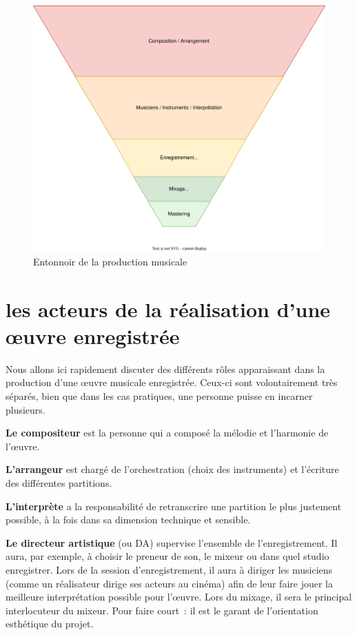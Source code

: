 \documentclass[
]{book}
\begin{document}
\begin{figure}
\includegraphics[width=0.8\linewidth]{_resources/diagrams/productionSonore} \caption{Entonnoir de la production musicale}\label{fig:unnamed-chunk-2}
\end{figure}

\hypertarget{les-acteurs-de-la-ruxe9alisation-dune-ux153uvre-enregistruxe9e}{%
\section{les acteurs de la réalisation d'une œuvre enregistrée}\label{les-acteurs-de-la-ruxe9alisation-dune-ux153uvre-enregistruxe9e}}

Nous allons ici rapidement discuter des différents rôles apparaissant dans la production d'une œuvre musicale enregistrée. Ceux-ci sont volontairement très séparés, bien que dans les cas pratiques, une personne puisse en incarner plusieurs.

\textbf{Le compositeur} est la personne qui a composé la mélodie et l'harmonie de l'œuvre.

\textbf{L'arrangeur} est chargé de l'orchestration (choix des instruments) et l'écriture des différentes partitions.

\textbf{L'interprète} a la responsabilité de retranscrire une partition le plus justement possible, à la fois dans sa dimension technique et sensible.

\textbf{Le directeur artistique} (ou DA) supervise l'ensemble de l'enregistrement. Il aura, par exemple, à choisir le preneur de son, le mixeur ou dans quel studio enregistrer. Lors de la session d'enregistrement, il aura à diriger les musiciens (comme un réalisateur dirige ses acteurs au cinéma) afin de leur faire jouer la meilleure interprétation possible pour l'œuvre. Lors du mixage, il sera le principal interlocuteur du mixeur. Pour faire court~: il est le garant de l'orientation esthétique du projet.
\end{document}

